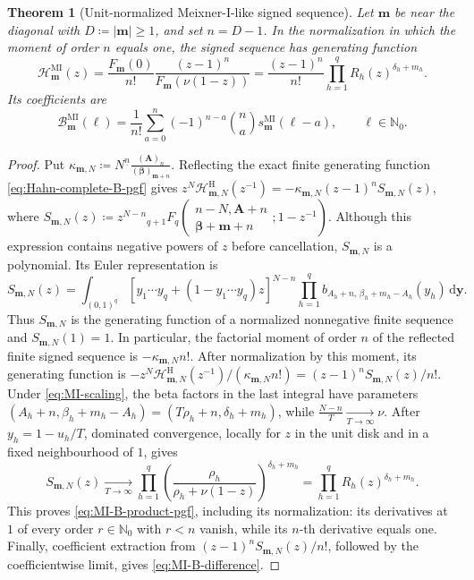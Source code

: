 \documentclass[10pt]{amsart}
\newcommand{\Nzero}{\mathbb N_0}
\newcommand{\dd}{\,\mathrm d}
\newcommand{\A}{\boldsymbol A}
\newcommand{\bbeta}{\boldsymbol\beta}
\newcommand{\mm}{\boldsymbol m}
\newcommand{\abs}[1]{\lvert#1\rvert}
\newcommand{\fall}[2]{#1^{\underline{#2}}}
\newcommand{\pFq}[5]{{}_{#1}F_{#2}\!\left(\begin{matrix}#3\\#4\end{matrix};#5\right)}
\theoremstyle{plain}
\newtheorem{theorem}{Theorem}[section]
\theoremstyle{definition}
\theoremstyle{remark}
\begin{document}
\begin{theorem}[Unit-normalized Meixner-I-like signed sequence]
\label{thm:MI-B}
Let \(\mm\) be near the diagonal with \(D\coloneq\abs\mm\ge1\), and set
\(n=D-1\). In the normalization in which the moment of order \(n\) equals one, the
signed sequence has generating function
\begin{equation}
 \mathcal H_{\mm}^{\mathrm{MI}}(z)
 =\frac{F_{\mm}(0)}{n!}
   \frac{(z-1)^n}{F_{\mm}(\nu(1-z))}
 =\frac{(z-1)^n}{n!}
   \prod_{h=1}^qR_h(z)^{\delta_h+m_h}.
 \label{eq:MI-B-product-pgf}
\end{equation}
Its coefficients are
\begin{equation}
 \mathcal B_{\mm}^{\mathrm{MI}}(\ell)
 =\frac1{n!}\sum_{a=0}^n(-1)^{n-a}\binom na
 s_{\mm}^{\mathrm{MI}}(\ell-a),
 \qquad \ell\in\Nzero.
 \label{eq:MI-B-difference}
\end{equation}
\end{theorem}

\begin{proof}
Put \(\kappa_{\mm,N}\coloneq\fall{N}{n}\frac{(\A)_n}{(\bbeta)_{\mm+n}}\).
Reflecting the exact finite generating function
\eqref{eq:Hahn-complete-B-pgf} gives
\(z^N\mathcal H^{\mathrm H}_{\mm,N}(z^{-1})
=-\kappa_{\mm,N}(z-1)^nS_{\mm,N}(z)\), where
\(S_{\mm,N}(z)\coloneq z^{N-n}
\pFq{q+1}{q}{n-N,\A+n}{\bbeta+\mm+n}{1-z^{-1}}\).
Although this expression contains negative powers of \(z\) before
cancellation, \(S_{\mm,N}\) is a polynomial. Its Euler representation is
\[
 S_{\mm,N}(z)=\int_{(0,1)^q}
 [y_1\cdots y_q+(1-y_1\cdots y_q)z]^{N-n}
 \prod_{h=1}^q
 b_{A_h+n,\,\beta_h+m_h-A_h}(y_h)\dd\boldsymbol y.
\]
Thus \(S_{\mm,N}\) is the generating function of a normalized
nonnegative finite sequence and \(S_{\mm,N}(1)=1\). In particular, the
factorial moment of order \(n\) of the reflected finite signed sequence is
\(-\kappa_{\mm,N}n!\). After normalization by this moment, its generating
function is
\(-z^N\mathcal H^{\mathrm H}_{\mm,N}(z^{-1})/(\kappa_{\mm,N}n!)
=(z-1)^nS_{\mm,N}(z)/n!\).
Under \eqref{eq:MI-scaling}, the beta factors in the last integral have
parameters
\((A_h+n,\beta_h+m_h-A_h)=(T\rho_h+n,\delta_h+m_h)\), while
\(\frac{N-n}{T}\xrightarrow[T\to\infty]{}\nu\).
After \(y_h=1-u_h/T\), dominated convergence, locally for \(z\) in the
unit disk and in a fixed neighbourhood of \(1\), gives
\[
 S_{\mm,N}(z)\xrightarrow[T\to\infty]{}
 \prod_{h=1}^q
 \left(\frac{\rho_h}{\rho_h+\nu(1-z)}\right)^{\delta_h+m_h}
 =\prod_{h=1}^qR_h(z)^{\delta_h+m_h}.
\]
This proves \eqref{eq:MI-B-product-pgf}, including its normalization: its
derivatives at \(1\) of every order \(r\in\Nzero\) with \(r<n\) vanish, while its \(n\)-th
derivative equals one. Finally, coefficient extraction from
\((z-1)^nS_{\mm,N}(z)/n!\), followed by the coefficientwise limit,
gives \eqref{eq:MI-B-difference}.
\end{proof}
\end{document}
